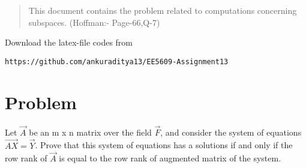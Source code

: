 \documentclass[journal,12pt,twocolumn]{IEEEtran}
\begin{document}
\begin{abstract}
This document contains the problem related to computations concerning subspaces. (Hoffman:- Page-66,Q-7) 
\end{abstract}
Download the latex-file codes from 
\begin{lstlisting}
https://github.com/ankuraditya13/EE5609-Assignment13
\end{lstlisting}

\section{Problem}
Let $\vec{A}$ be an m x n matrix over the field $\vec{F}$, and consider the system of equations $\vec{AX}=\vec{Y}$. Prove that this system of equations has a solutions if and only if the row rank of $\vec{A}$ is equal to the row rank of augmented matrix of the system. 
\end{document}
